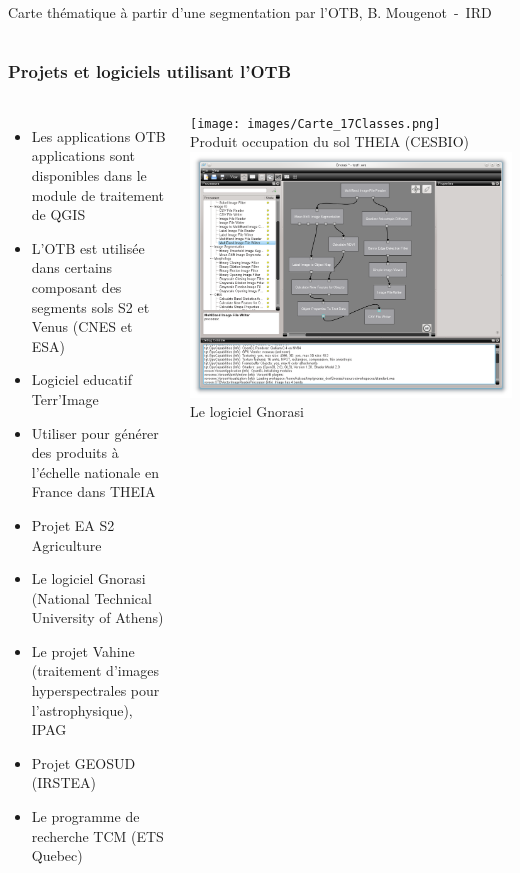 \documentclass[8pt]{beamer}
\begin{document}
\begin{frame}
\begin{columns}
\tiny{Carte thématique à partir d'une segmentation par l'OTB, B. Mougenot~-~IRD}
\end{columns}
\end{frame}

\begin{frame}
\frametitle{Projets et logiciels utilisant l'OTB}
\begin{columns}
  \begin{itemize}
    \item Les applications OTB applications sont disponibles dans le module de traitement de QGIS
    \item L'OTB est utilisée dans certains composant des segments sols S2 et
      Venus (CNES et ESA)
    \item Logiciel educatif Terr'Image
    \item Utiliser pour générer des produits à l'échelle nationale en France
      dans THEIA
    \item Projet EA S2 Agriculture
    \item Le logiciel Gnorasi (National Technical University of Athens)
    \item Le projet Vahine (traitement d'images hyperspectrales pour l'astrophysique), IPAG
    \item Projet GEOSUD (IRSTEA)
    \item Le programme de recherche TCM (ETS Quebec)
  \end{itemize}
\begin{center}
  \texttt{[image: images/Carte\_17Classes.png]}\\
  \tiny{Produit occupation du sol THEIA (CESBIO)}
  \includegraphics[width=\textwidth]{images/gnorasi2.png}\\
  \tiny{Le logiciel Gnorasi}
\end{center}
\end{columns}
\end{frame}
\end{document}
